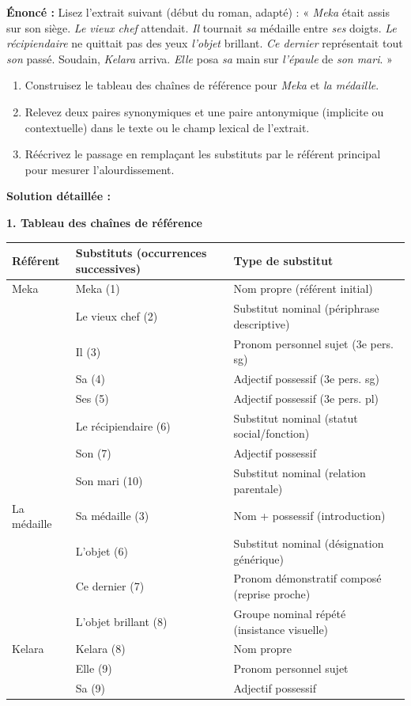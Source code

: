 \documentclass[11pt]{article}
\begin{document}
\begin{exoresolu}
\textbf{Énoncé :} Lisez l'extrait suivant (début du roman, adapté) :
« \emph{Meka} était assis sur son siège. \emph{Le vieux chef} attendait. \emph{Il} tournait \emph{sa} médaille entre \emph{ses} doigts. \emph{Le récipiendaire} ne quittait pas des yeux \emph{l'objet} brillant. \emph{Ce dernier} représentait tout \emph{son} passé. Soudain, \emph{Kelara} arriva. \emph{Elle} posa \emph{sa} main sur \emph{l'épaule} de \emph{son mari}. »
\begin{enumerate}
    \item Construisez le tableau des chaînes de référence pour \emph{Meka} et \emph{la médaille}.
    \item Relevez deux paires synonymiques et une paire antonymique (implicite ou contextuelle) dans le texte ou le champ lexical de l'extrait.
    \item Réécrivez le passage en remplaçant les substituts par le référent principal pour mesurer l'alourdissement.
\end{enumerate}
\tcblower
\textbf{Solution détaillée :}

\textbf{1. Tableau des chaînes de référence}

\begin{center}
\begin{tabularx}{\linewidth}{|l|X|X|}\hline
\textbf{Référent} & \textbf{Substituts (occurrences successives)} & \textbf{Type de substitut} \\ \hline
Meka & Meka (1) & Nom propre (référent initial) \\
& Le vieux chef (2) & Substitut nominal (périphrase descriptive) \\
& Il (3) & Pronom personnel sujet (3e pers. sg) \\
& Sa (4) & Adjectif possessif (3e pers. sg) \\
& Ses (5) & Adjectif possessif (3e pers. pl) \\
& Le récipiendaire (6) & Substitut nominal (statut social/fonction) \\
& Son (7) & Adjectif possessif \\
& Son mari (10) & Substitut nominal (relation parentale) \\ \hline
La médaille & Sa médaille (3) & Nom + possessif (introduction) \\
& L'objet (6) & Substitut nominal (désignation générique) \\
& Ce dernier (7) & Pronom démonstratif composé (reprise proche) \\
& L'objet brillant (8) & Groupe nominal répété (insistance visuelle) \\ \hline
Kelara & Kelara (8) & Nom propre \\
& Elle (9) & Pronom personnel sujet \\
& Sa (9) & Adjectif possessif \\ \hline
\end{tabularx}
\end{center}


\end{exoresolu}
\end{document}
